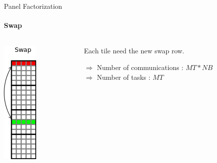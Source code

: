 \begin{frame}{Panel Factorization}
\framesubtitle{Swap}
\begin{columns}
\begin{column}{.30\textwidth}
\begin{center}
\includegraphics[scale=0.8]{panel_swap.png}
\end{center}
\end{column}
\hfill
\begin{column}{.70\textwidth}
Each tile need the new swap row.
\begin{center}
\begin{exampleblock}{}
$\Longrightarrow$ Number of communications : $MT*NB$\\
$\Longrightarrow$ Number of tasks : $MT$
\end{exampleblock}{}
\end{center}
\end{column}
\end{columns}
\end{frame}

